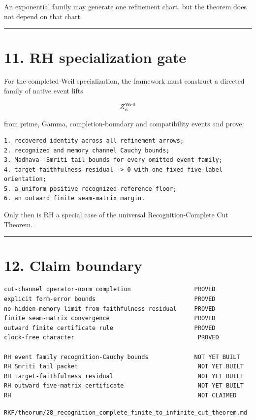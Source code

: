 An exponential family may generate one refinement chart, but the theorem does
not depend on that chart.

\begin{center}\rule{0.5\linewidth}{0.5pt}\end{center}

\hypertarget{rh-specialization-gate}{%
\section{11. RH specialization gate}\label{rh-specialization-gate}}

For the completed-Weil specialization, the framework must construct a directed
family of native event lifts

\[
Z_n^{\rm Weil}
\]

from prime, Gamma, completion-boundary and compatibility events and prove:

\begin{verbatim}
1. recovered identity across all refinement arrows;
2. recognized and memory channel Cauchy bounds;
3. Madhava--Smriti tail bounds for every omitted event family;
4. target-faithfulness residual -> 0 with one fixed five-label orientation;
5. a uniform positive recognized-reference floor;
6. an outward finite seam-matrix margin.
\end{verbatim}

Only then is RH a special case of the universal Recognition-Complete Cut
Theorem.

\begin{center}\rule{0.5\linewidth}{0.5pt}\end{center}

\hypertarget{claim-boundary}{%
\section{12. Claim boundary}\label{claim-boundary}}

\begin{verbatim}
cut-channel operator-norm completion                  PROVED
explicit form-error bounds                            PROVED
no-hidden-memory limit from faithfulness residual     PROVED
finite seam-matrix convergence                        PROVED
outward finite certificate rule                       PROVED
clock-free character                                   PROVED

RH event family recognition-Cauchy bounds             NOT YET BUILT
RH Smriti tail packet                                  NOT YET BUILT
RH target-faithfulness residual                        NOT YET BUILT
RH outward five-matrix certificate                     NOT YET BUILT
RH                                                     NOT CLAIMED
\end{verbatim}

\begin{flushright}\small\texttt{RKF/theorum/28\_recognition\_complete\_finite\_to\_infinite\_cut\_theorem.md}\end{flushright}
